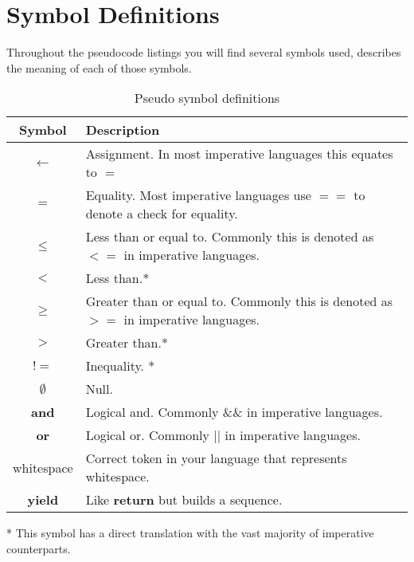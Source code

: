 \chapter{Symbol Definitions}
Throughout the pseudocode listings you will find several symbols used,  describes the meaning of each of those symbols.

\begin{table}[h]
\caption{Pseudo symbol definitions}
\begin{tabular}[t]{|c|l|}
\hline
\textbf{Symbol} & \textbf{Description} \\
\hline
$\leftarrow$ & Assignment. In most imperative languages this equates to $=$ \\
\hline
$=$ & Equality. Most imperative languages use $==$ to denote a check for equality. \\
\hline
$\leq$ & Less than or equal to. Commonly this is denoted as $<=$ in imperative languages. \\
\hline
$<$ & Less than.* \\
\hline
$\geq$ & Greater than or equal to. Commonly this is denoted as $>=$ in imperative languages. \\
\hline
$>$ & Greater than.* \\
\hline
$!=$ & Inequality. * \\
\hline
$\emptyset$ & Null. \\
\hline
\textbf{and} & Logical and. Commonly \&\& in imperative languages. \\
\hline
\textbf{or} & Logical or. Commonly || in imperative languages. \\ 
\hline
whitespace & Correct token in your language that represents whitespace. \\
\hline
\textbf{yield} & Like \textbf{return} but builds a sequence. \\
\hline
\end{tabular}
\end{table}

* This symbol has a direct translation with the vast majority of imperative counterparts.
